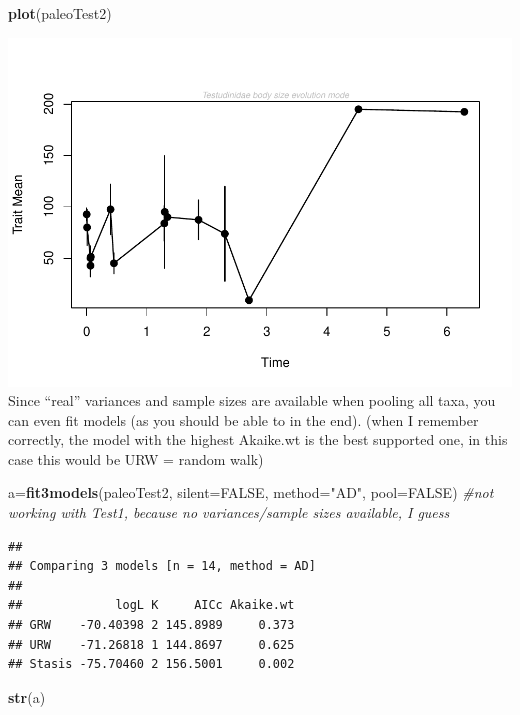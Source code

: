 \documentclass[]{article}
\newenvironment{Shaded}{\begin{snugshade}}{\end{snugshade}}
\newcommand{\KeywordTok}[1]{\textcolor[rgb]{0.13,0.29,0.53}{\textbf{{#1}}}}
\newcommand{\DataTypeTok}[1]{\textcolor[rgb]{0.13,0.29,0.53}{{#1}}}
\newcommand{\StringTok}[1]{\textcolor[rgb]{0.31,0.60,0.02}{{#1}}}
\newcommand{\CommentTok}[1]{\textcolor[rgb]{0.56,0.35,0.01}{\textit{{#1}}}}
\newcommand{\OtherTok}[1]{\textcolor[rgb]{0.56,0.35,0.01}{{#1}}}
\newcommand{\NormalTok}[1]{{#1}}
\begin{document}
\begin{Shaded}
\begin{Highlighting}[]
\KeywordTok{plot}\NormalTok{(paleoTest2)}
\end{Highlighting}
\end{Shaded}

\includegraphics{tortoise_notes_files/figure-latex/unnamed-chunk-4-1.pdf}
Since ``real'' variances and sample sizes are available when pooling all
taxa, you can even fit models (as you should be able to in the end).
(when I remember correctly, the model with the highest Akaike.wt is the
best supported one, in this case this would be URW = random walk)

\begin{Shaded}
\begin{Highlighting}[]
\NormalTok{a=}\KeywordTok{fit3models}\NormalTok{(paleoTest2, }\DataTypeTok{silent=}\OtherTok{FALSE}\NormalTok{, }\DataTypeTok{method=}\StringTok{"AD"}\NormalTok{, }\DataTypeTok{pool=}\OtherTok{FALSE}\NormalTok{)   }\CommentTok{#not working with Test1, because no variances/sample sizes available, I guess}
\end{Highlighting}
\end{Shaded}

\begin{verbatim}
## 
## Comparing 3 models [n = 14, method = AD]
## 
##             logL K     AICc Akaike.wt
## GRW    -70.40398 2 145.8989     0.373
## URW    -71.26818 1 144.8697     0.625
## Stasis -75.70460 2 156.5001     0.002
\end{verbatim}

\begin{Shaded}
\begin{Highlighting}[]
\KeywordTok{str}\NormalTok{(a)}
\end{Highlighting}
\end{Shaded}
\end{document}
